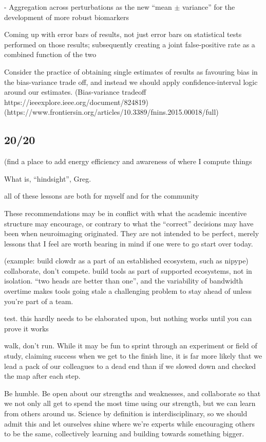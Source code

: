 - Aggregation across perturbations as the new ``mean $\pm$ variance'' for the development of more robust biomarkers

Coming up with error bars of results, not just error bars on statistical tests performed on those results; subsequently
creating a joint false-positive rate as a combined function of the two

Consider the practice of obtaining single estimates of results as favouring bias in the bias-variance trade off, and
instead we should apply confidence-interval logic around our estimates.
(Bias-variance tradeoff https://ieeexplore.ieee.org/document/824819)
(https://www.frontiersin.org/articles/10.3389/fnins.2015.00018/full)

\subsection{20/20}
(find a place to add energy efficiency and awareness of where I compute things 

What is, ``hindsight'', Greg. 

all of these lessons are both for myself and for the community

These recommendations may be in conflict with what the academic incentive structure may encourage, or contrary to what
the ``correct'' decisions may have been when neuroimaging originated. They are not intended to be perfect, merely
lessons that I feel are worth bearing in mind if one were to go start over today.

(example: build clowdr as a part of an established ecosystem, such as nipype)
collaborate, don't compete. build tools as part of supported ecosystems, not in isolation. ``two heads are better
than one'', and the variability of bandwidth overtime makes tools going stale a challenging problem to stay ahead of
unless you're part of a team.

test. this hardly needs to be elaborated upon, but nothing works until you can prove it works

walk, don't run. While it may be fun to sprint through an experiment or field of study, claiming success when we get to
the finish line, it is far more likely that we lead a pack of our colleagues to a dead end than if we slowed down and
checked the map after each step.

Be humble. Be open about our strengths and weaknesses, and collaborate so that we not only all get to spend the most
time using our strength, but we can learn from others around us. Science by definition is interdisciplinary, so we
should admit this and let ourselves shine where we're experts while encouraging others to be the same, collectively
learning and building towards something bigger.

